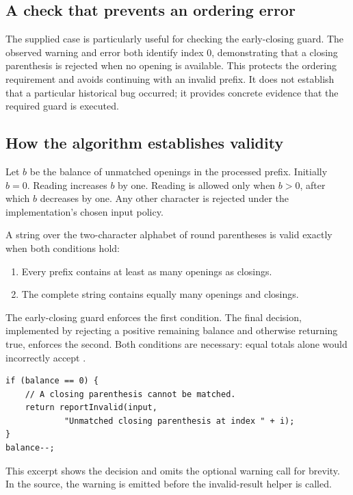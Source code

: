 \subsection{A check that prevents an ordering error}
The supplied \code{)((()))} case is particularly useful for checking the early-closing guard. The observed warning and error both identify index 0, demonstrating that a closing parenthesis is rejected when no opening is available. This protects the ordering requirement and avoids continuing with an invalid prefix. It does not establish that a particular historical bug occurred; it provides concrete evidence that the required guard is executed.

\subsection{How the algorithm establishes validity}
Let $b$ be the balance of unmatched openings in the processed prefix. Initially $b=0$. Reading \code{(} increases $b$ by one. Reading \code{)} is allowed only when $b>0$, after which $b$ decreases by one. Any other character is rejected under the implementation's chosen input policy.

A string over the two-character alphabet of round parentheses is valid exactly when both conditions hold:
\begin{enumerate}
\item Every prefix contains at least as many openings as closings.
\item The complete string contains equally many openings and closings.
\end{enumerate}
The early-closing guard enforces the first condition. The final  decision, implemented by rejecting a positive remaining balance and otherwise returning true, enforces the second. Both conditions are necessary: equal totals alone would incorrectly accept \code{)(}.

\begin{samepage}
\begin{lstlisting}
if (balance == 0) {
    // A closing parenthesis cannot be matched.
    return reportInvalid(input,
            "Unmatched closing parenthesis at index " + i);
}
balance--;
\end{lstlisting}
\end{samepage}
This excerpt shows the decision and omits the optional warning call for brevity. In the source, the warning is emitted before the invalid-result helper is called.

